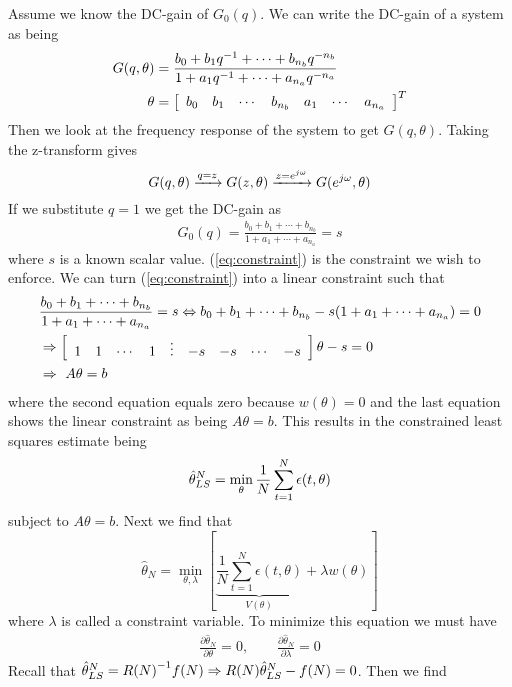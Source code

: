 \begin{example}
Assume we know the DC-gain of $G_0(q)$.
We can write the DC-gain of a system as being
\begin{align*}
G(q,\theta) &= \frac{b_0+b_1q^{-1}+\cdots+b_{n_b}q^{-n_b}}{1+a_1q^{-1}+\cdots+a_{n_a}q^{-n_a}} \\
\theta &= \left[\begin{array}{c c c c c c c} b_0 & b_1 & \cdots & b_{n_b} & a_1 & \cdots & a_{n_a} \end{array}\right]^T \\
\end{align*}
Then we look at the frequency response of the system to get $G(q,\theta)$.
Taking the z-transform gives
$$G(q,\theta) \xrightarrow{q=z} G(z,\theta) \xrightarrow{z=e^{j\omega}} G(e^{j\omega},\theta)$$
If we substitute $q=1$ we get the DC-gain as
\begin{align}
\label{eq:constraint}
G_0(q) = \frac{b_0+b_1+\cdots+b_{n_b}}{1+a_1+\cdots+a_{n_a}} = s
\end{align}
where $s$ is a known scalar value.
(\ref{eq:constraint}) is the constraint we wish to enforce.
We can turn (\ref{eq:constraint}) into a linear constraint such that
\begin{align*}
&\frac{b_0+b_1+\cdots+b_{n_b}}{1+a_1+\cdots+a_{n_a}} = s \Leftrightarrow b_0+b_1+\cdots+b_{n_b} - s(1+a_1+\cdots+a_{n_a}) = 0 \\
&\Rightarrow \left[\begin{array}{c c c c c c c c c} 1 & 1 & \cdots & 1 & \vdots & -s & -s & \cdots & -s \end{array}\right]\theta-s=0 \\
&\Rightarrow~A\theta=b
\end{align*}
where the second equation equals zero because $w(\theta)=0$ and the last equation shows the linear constraint as being $A\theta=b$.
This results in the constrained least squares estimate being
$$\hat{\theta}_{LS}^N = \min_\theta\frac{1}{N}\sum_{t=1}^N\epsilon(t,\theta)$$
subject to $A\theta=b$.
Next we find that
$$\hat{\theta}_N = \min_{\theta,\lambda}\left[\underbrace{\frac{1}{N}\sum_{t=1}^N\epsilon(t,\theta)}_{V(\theta)} +\lambda w(\theta)\right]$$
where $\lambda$ is called a constraint variable.
To minimize this equation we must have
\begin{align*}
\frac{\partial\hat{\theta}_N}{\partial\theta}=0, \qquad \frac{\partial\hat{\theta}_N}{\partial\lambda}=0
\end{align*}
Recall that $\hat{\theta}_{LS}^N={R(N)}^{-1}f(N)\Rightarrow R(N)\hat{\theta}_{LS}^N-f(N)=0$.
Then we find
\begin{align*}

\end{align*}
\end{example}

